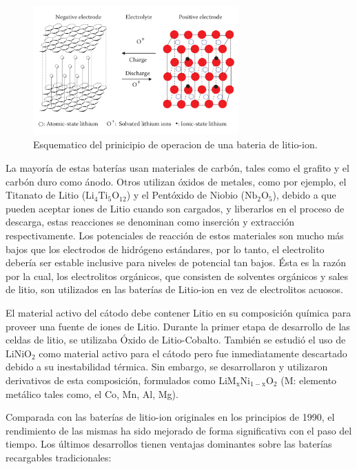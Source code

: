\documentclass[10pt,a4paper]{article}
\begin{document}
\begin{figure}[h!]
    \begin{center}
	\includegraphics[width=0.7\textwidth]{prin_litio}
	\caption{Esquematico del prinicipio de operacion de una bateria de
	litio-ion.}
	\label{op_lithium-ion}
    \end{center}
\end{figure}

\noindent La mayoría de estas baterías usan materiales de carbón, tales como el
grafito y el carbón duro como ánodo. Otros utilizan óxidos de metales, como por
ejemplo, el Titanato de Litio ($\mathrm{Li_4Ti_5O_{12}}$) y el Pentóxido de
Niobio ($\mathrm{Nb_2O_5}$), debido a que pueden aceptar iones de Litio cuando
son cargados, y liberarlos en el proceso de descarga, estas reacciones se
denominan como inserción y extracción respectivamente.  Los potenciales de
reacción de estos materiales son mucho más bajos que los electrodos de hidrógeno
estándares, por lo tanto, el electrolito debería ser estable inclusive para
niveles de potencial tan bajos. Ésta es la razón por la cual, los electrolitos
orgánicos, que consisten de solventes orgánicos y sales de litio, son utilizados
en las baterías de Litio-ion en vez de electrolitos acuosos.

\noindent El material activo del cátodo debe contener Litio en su composición
química para proveer una fuente de iones de Litio. Durante la primer etapa de
desarrollo de las celdas de litio, se utilizaba Óxido de Litio-Cobalto.  También
se estudió el uso de $\mathrm{LiNiO_2}$ como material activo para el cátodo pero
fue inmediatamente descartado debido a su inestabilidad térmica. Sin embargo, se
desarrollaron y utilizaron derivativos de esta composición, formulados como
$\mathrm{LiM_xNi_{1-x}O_2}$ (M: elemento metálico tales como, el Co, Mn, Al,
Mg).

Comparada con las baterías de litio-ion originales en los principios de 1990, el
rendimiento de las mismas ha sido mejorado de forma significativa con el paso
del tiempo. Los últimos desarrollos tienen ventajas dominantes sobre las
baterías recargables tradicionales:
\end{document}
